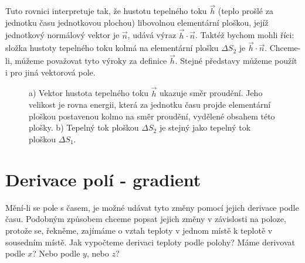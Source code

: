       Tuto rovnici interpretuje tak, že hustotu tepelného toku $\vec{h}$ (teplo prošlé za jednotku 
      času jednotkovou plochou) libovolnou elementární ploškou, jejíž jednotkový normálový vektor je 
      $\vec{n}$, udává výraz $\vec{h}\cdot\vec{n}$. Taktéž bychom mohli říci: složka hustoty 
      tepelného toku kolmá na elementární plošku $\Delta S_2$ je $\vec{h}\cdot\vec{n}$. Chceme-li, 
      můžeme považovat tyto výro\-ky za definice $\vec{h}$. Stejné představy můžeme použít i pro 
      jiná vektorová pole.             
      

      \begin{figure}[hb!]
        \centering
        \hspace{0.1\textwidth}
        \caption{a) Vektor hustota tepelného toku $\vec{h}$ ukazuje směr proudění. Jeho velikost je  
                 rovna energii, která za jednotku času projde elementární ploškou postavenou kolmo 
                 na směr proudění, vydělené obsahem této plošky. b) Tepelný tok ploškou $\Delta S_2$ 
                 je stejný jako tepelný tok ploškou $\Delta S_1$.}
        \label{fey:fig_tok_ploska}
      \end{figure}
        
  \section{Derivace polí - gradient}
    \cite[s.~31]{Feynman02} Mění-li se pole s časem, je možné udávat tyto změny pomocí jejich 
    derivace podle času. Podobným způsobem chceme popsat jejich změny v závislosti na poloze, 
    protože se, řekněme, zajímáme o vztah teploty v jednom místě k teplotě v sousedním místě. Jak 
    vypočteme derivaci teploty podle polohy? Máme derivovat podle $x$? Nebo podle $y$, nebo $z$?
  
